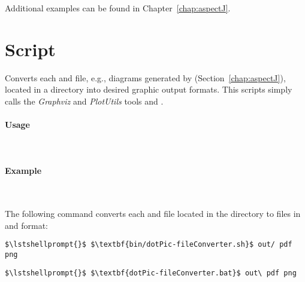 \noindent Additional examples can be found in Chapter~\ref{chap:aspectJ}.

\section{Script }\label{appendix:wrapperScripts:dotPicFileConverter}

Converts each  and  file, e.g., diagrams generated by %
\KiekerTraceAnalysis{} (Section~\ref{chap:aspectJ}), located in a directory %
into desired graphic output formats. %
This scripts simply calls the \textit{Graphviz} and \textit{PlotUtils} tools  and .

\paragraph*{Usage}\

\setTextListing


\paragraph*{Example}\

\noindent The following command converts each  and  file located in the %
directory  to files in  and  format:

\setTextListing
\begin{lstlisting}[caption=Execution under UNIX-like systems]
$\lstshellprompt{}$ $\textbf{bin/dotPic-fileConverter.sh}$ out/ pdf png
\end{lstlisting}
\begin{lstlisting}[caption=Execution under Windows]
$\lstshellprompt{}$ $\textbf{dotPic-fileConverter.bat}$ out\ pdf png
\end{lstlisting}